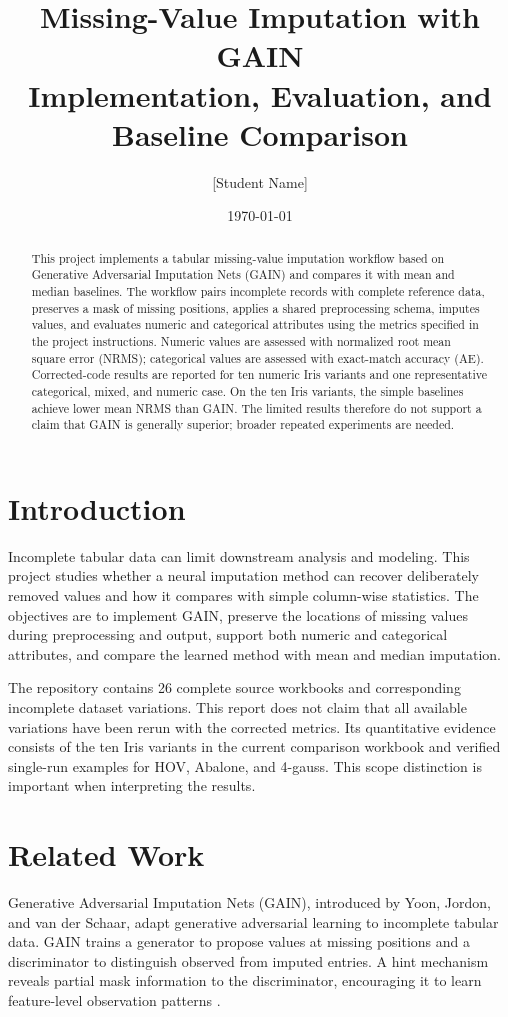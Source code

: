 \documentclass[11pt]{article}
\title{Missing-Value Imputation with GAIN\\\large Implementation, Evaluation, and Baseline Comparison}
\author{[Student Name]\\[Course / Group]}
\date{\today}
\begin{document}
\maketitle

\begin{abstract}
This project implements a tabular missing-value imputation workflow based on Generative Adversarial Imputation Nets (GAIN) and compares it with mean and median baselines. The workflow pairs incomplete records with complete reference data, preserves a mask of missing positions, applies a shared preprocessing schema, imputes values, and evaluates numeric and categorical attributes using the metrics specified in the project instructions. Numeric values are assessed with normalized root mean square error (NRMS); categorical values are assessed with exact-match accuracy (AE). Corrected-code results are reported for ten numeric Iris variants and one representative categorical, mixed, and numeric case. On the ten Iris variants, the simple baselines achieve lower mean NRMS than GAIN. The limited results therefore do not support a claim that GAIN is generally superior; broader repeated experiments are needed.
\end{abstract}

\section{Introduction}
Incomplete tabular data can limit downstream analysis and modeling. This project studies whether a neural imputation method can recover deliberately removed values and how it compares with simple column-wise statistics. The objectives are to implement GAIN, preserve the locations of missing values during preprocessing and output, support both numeric and categorical attributes, and compare the learned method with mean and median imputation.

The repository contains 26 complete source workbooks and corresponding incomplete dataset variations. This report does not claim that all available variations have been rerun with the corrected metrics. Its quantitative evidence consists of the ten Iris variants in the current comparison workbook and verified single-run examples for HOV, Abalone, and 4-gauss. This scope distinction is important when interpreting the results.

\section{Related Work}
Generative Adversarial Imputation Nets (GAIN), introduced by Yoon, Jordon, and van der Schaar, adapt generative adversarial learning to incomplete tabular data. GAIN trains a generator to propose values at missing positions and a discriminator to distinguish observed from imputed entries. A hint mechanism reveals partial mask information to the discriminator, encouraging it to learn feature-level observation patterns \cite{yoon2018gain}.
\end{document}
